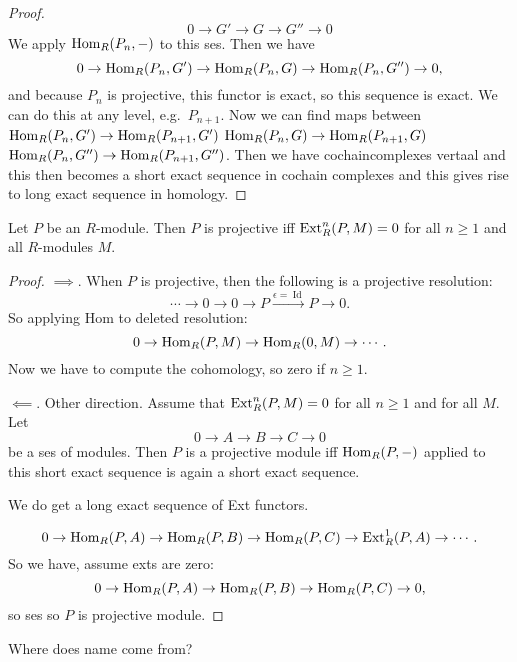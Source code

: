 \begin{proof}
    \[
        0 \to  G' \to  G \to  G'' \to  0
    \]
    We apply $\operatorname{Hom}_{R}(P_n, -)$ to this ses.
    Then we have
    \[
     0 \to  \operatorname{Hom}_{R}(P_n, G') \to  \operatorname{Hom}_{R}(P_n, G) \to  \operatorname{Hom}_{R}(P_n, G'') \to  0
    ,\] 
    and because $P_n$ is projective, this functor is exact, so this sequence is exact.
    We can do this at any level, e.g.\ $P_{n+1}$.
    Now we can find maps between
    $\operatorname{Hom}_{R}(P_n, G') \to \operatorname{Hom}_{R}(P_{n+1}, G')$
    $\operatorname{Hom}_{R}(P_n, G) \to \operatorname{Hom}_{R}(P_{n+1}, G)$
    $\operatorname{Hom}_{R}(P_n, G'') \to \operatorname{Hom}_{R}(P_{n+1}, G'')$.
    Then we have cochaincomplexes vertaal and this then becomes a short exact sequence in cochain complexes and this gives rise to long exact sequence in homology.

\end{proof}

\begin{theorem}[2.12]
    Let $P$ be an $R$-module.
    Then $P$ is projective iff $\operatorname{Ext}_R^{n}(P, M) = 0$ for all $n \ge 1$ and all $R$-modules $M$.
\end{theorem}
\begin{proof}
    $\implies$. When $P$ is projective, then  the following is a projective resolution:
    \[
    \cdots \to  0 \to  0 \to  P \xrightarrow{\epsilon = \operatorname{Id}}   P \to  0
    .\] 
    So applying Hom to deleted resolution:
    \[
    0 \to  \operatorname{Hom}_{R}(P, M) \to  \operatorname{Hom}_{R}(0, M) \to  \cdots
    .\] 
    Now we have to compute the cohomology, so zero if $n \ge 1$.

    $\impliedby$. Other direction.
    Assume that $\operatorname{Ext}_R^{n}(P, M) = 0$ for all $n \ge 1$ and for all $M$.
    Let
     \[
    0 \to  A \to  B \to  C \to  0
    \] 
    be a ses of modules.
    Then $P$ is a projective module iff $ \operatorname{Hom}_{R}(P, -)$ applied to this short exact sequence is again a short exact sequence.

    We do get a long exact sequence of Ext functors.

    \[
        0 \to  \operatorname{Hom}_{R}(P, A) \to \operatorname{Hom}_{R}(P, B) \to \operatorname{Hom}_{R}(P, C) \to  \operatorname{Ext}_R^{1} (P, A) \to  \cdots
    .\] 
    So we have, assume exts are zero:
    \[
        0 \to  \operatorname{Hom}_{R}(P, A) \to \operatorname{Hom}_{R}(P, B) \to \operatorname{Hom}_{R}(P, C) \to  0
    ,\] 
    so ses so $P$ is projective module.
\end{proof}

Where does name come from?

